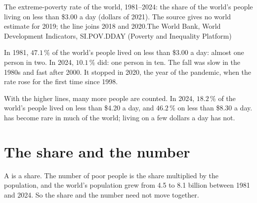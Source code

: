 \begin{omchart}{The extreme-poverty rate of the world, 1981--2024: the share of
the world's people living on less than \$3.00 a day (dollars of 2021). The source
gives no world estimate for 2019; the line joins 2018 and 2020.}{The World Bank,
World Development Indicators, SI.POV.DDAY (Poverty and Inequality Platform)}
\end{omchart}

In 1981, $47.1\,\%$ of the world's people lived on less than \$3.00 a day: almost
one person in two. In 2024, $10.1\,\%$ did: one person in ten. The fall was
slow in the 1980s and fast after 2000. It stopped in 2020, the year of the
pandemic, when the rate rose for the first time since 1998.

With the higher lines, many more people are counted. In 2024, $18.2\,\%$ of the
world's people lived on less than \$4.20 a day, and $46.2\,\%$ on less than
\$8.30 a day.  has become rare in much of the world; living on a
few dollars a day has not.

\section{The share and the number}

A  is a share. The number of poor people is the share multiplied by
the population, and the world's population grew from 4.5 to 8.1 billion
between 1981 and 2024. So the share and the number need not move together.

